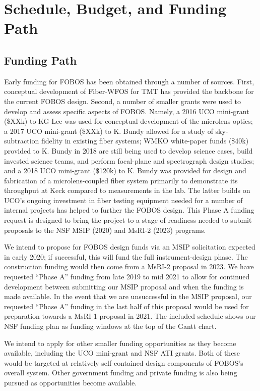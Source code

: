 
\section{Schedule, Budget, and Funding Path}
\label{sec:budget}

\subsection{Funding Path}

Early funding for FOBOS has been obtained through a number of
sources. First, conceptual development of Fiber-WFOS for TMT has
provided the backbone for the current FOBOS design. Second, a number
of smaller grants were used to develop and assess specific aspects of
FOBOS. Namely, a 2016 UCO mini-grant (\$XXk) to KG Lee was used for
conceptual development of the microlens optics; a 2017 UCO mini-grant
(\$XXk) to K. Bundy allowed for a study of sky-subtraction fidelity
in existing fiber systems; WMKO white-paper funds (\$40k) provided to
K. Bundy in 2018 are still being used to develop science cases, build
invested science teams, and perform focal-plane and spectrograph
design studies; and a 2018 UCO mini-grant (\$120k) to K. Bundy was
provided for design and fabrication of a microlens-coupled fiber
system primarily to demonstrate its throughput at Keck compared to
measurements in the lab. The latter builds on UCO's ongoing
investment in fiber testing equipment needed for a number of internal
projects has helped to further the FOBOS design. This Phase A funding
request is designed to bring the project to a stage of readiness
needed to submit proposals to the NSF MSIP (2020) and MsRI-2 (2023)
programs.

We intend to propose for FOBOS design funds via an MSIP solicitation
expected in early 2020; if successful, this will fund the full
instrument-design phase. The construction funding would then come
from a MsRI-2 proposal in 2023. We have requested ``Phase A'' funding
from late 2019 to mid 2021 to allow for continued development between
submitting our MSIP proposal and when the funding is made available.
In the event that we are unsuccessful in the MSIP proposal, our
requested ``Phase A'' funding in the last half of this proposal would
be used for preparation towards a MsRI-1 proposal in 2021. The
included schedule shows our NSF funding plan as funding windows at
the top of the Gantt chart.

We intend to apply for other smaller funding opportunities as they
become available, including the UCO mini-grant and NSF ATI grants.
Both of these would be targeted at relatively self-contained design
components of FOBOS's overall system. Other government funding and
private funding is also being pursued as opportunities become
available.

